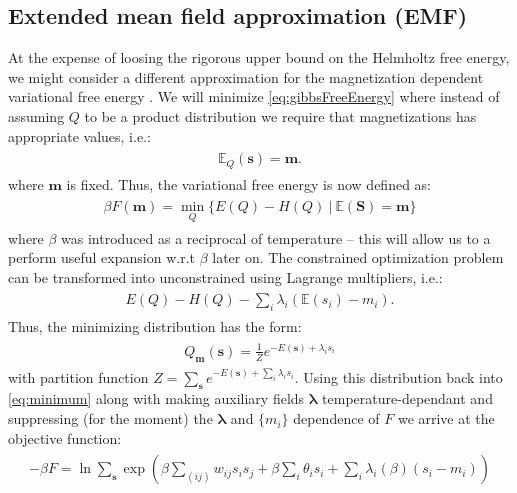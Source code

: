 \documentclass[../report/report.tex]{subfiles}
\begin{document}
\subsection{Extended mean field approximation (EMF)}
At the expense of loosing the rigorous upper bound on the Helmholtz free energy, we might consider a different approximation for the magnetization dependent variational free energy \cite{georges1991expand}. We will minimize \ref{eq:gibbsFreeEnergy} where instead of assuming $Q$ to be a product distribution we require that magnetizations has appropriate values, i.e.:
\begin{align}
\begin{split}
\mathbb{E}_Q (\mathbf{s}) = \mathbf{m} .
\label{eq:constraint}
\end{split}
\end{align}
 where $\mathbf{m}$ is fixed. Thus, the variational free energy is now defined as: 
 \begin{align}
\begin{split}
\beta F(\mathbf{m}) = \min_{Q} \{E(Q) - H(Q) ~|~\mathbb{E}(\mathbf{S}) = \mathbf{m} \}
\label{eq:minimum}
\end{split}
\end{align}
	where $\beta$ was introduced as a reciprocal of temperature -- this will allow us to a perform useful expansion w.r.t $\beta$ later on. The constrained optimization problem can be transformed into unconstrained using Lagrange multipliers, i.e.:
 \begin{align}
\begin{split}
E(Q) - H(Q) -  \sum_i \lambda_i(\mathbb{E}(s_i) - m_i). 
\end{split}
\end{align}
Thus, the minimizing distribution has the form:
 \begin{align}
\begin{split}
Q_{\mathbf{m}}(\mathbf{s}) = \frac{1}{Z} e^{-E(\mathbf{s}) + \lambda_i s_i}
\end{split}
\end{align}
with partition function $Z = \sum_{\mathbf{s}} e^{-E(\mathbf{s}) + \sum_i \lambda_i s_i}$. Using this distribution back into \ref{eq:minimum} along with making auxiliary fields $\mathbf{\lambda}$ temperature-dependant and suppressing (for the moment) the $\mathbf{\lambda}$ and $\{m_i \}$ dependence of $F$ we arrive at the objective function:
 \begin{align}
\begin{split} - \beta F = \ln \sum_{\mathbf{s}} \exp \left( \beta \sum_{(ij)} w_{ij} s_i s_j +\beta \sum_i  \theta_i s_i  + \sum_i \lambda_i (\beta) (s_i - m_i) \right)
\end{split}
\end{align}
\end{document}

